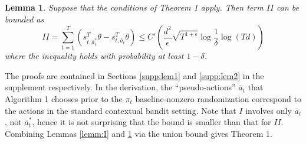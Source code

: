 \documentclass{article}
\newtheorem{lemma}{Lemma}
\begin{document}
\begin{lemma}\label{lemm:II}
Suppose that the conditions of Theorem 1 apply. Then term $II$ can be bounded as
\[
II = \sum_{t=1}^T (s_{t,\bar{a}^*_t}^T \theta - s_{t,\bar{a}_t}^T \theta) \leq C' \left(\frac{d^2}{\epsilon} \sqrt{T^{1+\epsilon}} \log \frac{1}{\delta} \log (Td)\right)
\]
where the inequality holds with probability at least $1-\delta$.
\end{lemma}
The proofs are contained in Sections \ref{supp:lem1} and \ref{supp:lem2} in the supplement respectively. %
In the derivation, the ``pseudo-actions'' $\bar{a}_t$ that Algorithm 1 chooses prior to the $\pi_t$ baseline-nonzero randomization correspond to the actions in the standard contextual bandit setting. Note that $I$ involves only $\bar{a}_t$, not $\bar{a}^*_t$, hence it is not surprising that the bound is smaller than that for $II$. Combining Lemmas \ref{lemm:I} and \ref{lemm:II} via the union bound gives Theorem 1.








\end{document}
